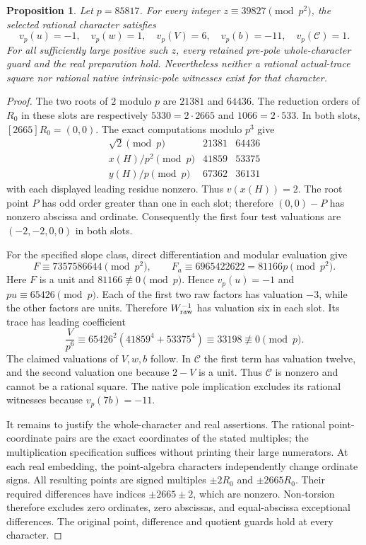 \documentclass[11pt,a4paper]{article}
\newtheorem{proposition}{Proposition}[section]
\begin{document}
\begin{proposition}\label{prop:counterexample}
Let $p=85817$. For every integer $z\equiv39827\pmod{p^2}$,
the selected rational character satisfies
\[
 v_p(u)=-1,\quad v_p(w)=1,\quad v_p(V)=6,
 \quad v_p(b)=-11,\quad v_p(\mathcal C)=1.
\]
For all sufficiently large positive such $z$, every retained
pre-pole whole-character guard and the real preparation hold.
Nevertheless neither a rational actual-trace square nor rational
native intrinsic-pole witnesses exist for that character.
\end{proposition}

\begin{proof}
The two roots of $2$ modulo $p$ are $21381$ and $64436$.
The reduction orders of $R_0$ in these slots are respectively
$5330=2\cdot2665$ and $1066=2\cdot533$. In both slots,
$[2665]R_0=(0,0)$. The exact computations modulo $p^3$ give
\[
\begin{array}{c|rr}
 \sqrt2\pmod p&21381&64436\\\hline
 x(H)/p^2\pmod p&41859&53375\\
 y(H)/p\pmod p&67362&36131
\end{array}
\]
with each displayed leading residue nonzero. Thus $v(x(H))=2$.
The root point $P$ has odd order greater than one in each slot;
therefore $(0,0)-P$ has nonzero abscissa and ordinate. Consequently
the first four test valuations are $(-2,-2,0,0)$ in both slots.

For the specified slope class, direct differentiation and modular
evaluation give
\[
 F\equiv7357586644\pmod{p^2},\qquad
 F_a\equiv6965422622=81166p\pmod{p^2}.
\]
Here $F$ is a unit and $81166\not\equiv0\pmod p$. Hence
$v_p(u)=-1$ and $pu\equiv65426\pmod p$. Each of the first two
raw factors has valuation $-3$, while the other factors are units.
Therefore $W_{\rm raw}^{-1}$ has valuation six in each slot.
Its trace has leading coefficient
\[
 \frac{V}{p^6}\equiv
 65426^2(41859^4+53375^4)\equiv33198\not\equiv0\pmod p.
\]
The claimed valuations of $V,w,b$ follow. In $\mathcal C$ the
first term has valuation twelve, and the second valuation one
because $2-V$ is a unit. Thus $\mathcal C$ is nonzero and cannot
be a rational square. The native pole implication
\cite[Theorem~1.1]{Intrinsic} excludes its rational witnesses
because $v_p(7b)=-11$.

It remains to justify the whole-character and real assertions.
The rational point-coordinate pairs are the exact coordinates of
the stated multiples; the multiplication specification suffices
without printing their large numerators. At each real embedding,
the point-algebra characters independently change ordinate signs.
All resulting points are signed multiples $\pm2R_0$ and
$\pm2665R_0$. Their required differences have indices
$\pm2665\pm2$, which are nonzero. Non-torsion therefore excludes
zero ordinates, zero abscissas, and equal-abscissa exceptional
differences. The original point, difference and quotient guards
hold at every character.


\end{proof}
\end{document}
